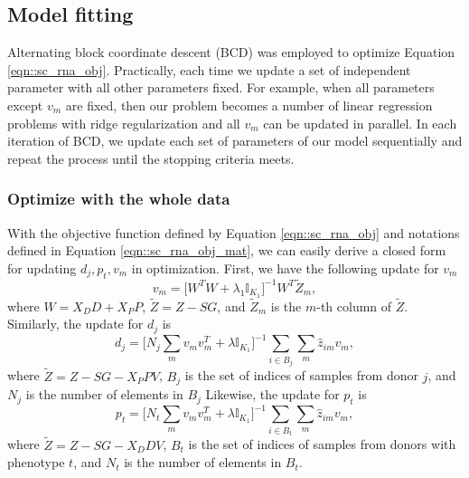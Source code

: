 \documentclass[12pt]{article}
\begin{document}
\subsection{Model fitting}
  Alternating block coordinate descent (BCD) was employed to optimize Equation \ref{eqn::sc_rna_obj}. Practically, each time we update a set of independent parameter with all other parameters fixed. For example, when all parameters except $v_m$ are fixed, then our problem becomes a number of linear regression problems with ridge regularization and all $v_m$ can be updated in parallel. In each iteration of BCD, we update each set of parameters of our model sequentially and repeat the process until the stopping criteria meets.

  \subsubsection*{Optimize with the whole data}
    With the objective function defined by Equation \ref{eqn::sc_rna_obj} and notations defined in Equation \ref{eqn::sc_rna_obj_mat}, we can easily derive a closed form for updating $d_j, p_t, v_m$ in optimization. First, we have the following update for $v_m$
    \begin{equation}
      \label{eqn::updating_vm}
      v_m = \big[ W^T W + \lambda_1 \mathbb{I}_{K_1} \big]^{-1} W^T \tilde{Z}_m,
    \end{equation}
    where $W = X_D D + X_P P$, $\tilde{Z} = Z - S G$, and $\tilde{Z}_m$ is the $m$-th column of $\tilde{Z}$. Similarly, the update for $d_j$ is 
    \begin{equation}
      \label{eqn::updating_dj}
      d_j = \big[ N_j \sum_m v_m v_m^T + \lambda \mathbb{I}_{K_1} \big]^{-1} \sum_{i \in B_j} \sum_m \hat{z}_{im} v_m,
    \end{equation}
    where $\tilde{Z} = Z - S G - X_P P V$, $B_j$ is the set of indices of samples from donor $j$, and $N_j$ is the number of elements in $B_j$ Likewise, the update for $p_t$ is 
    \begin{equation}
      \label{eqn::updating_pt}
      p_t = \big[ N_t \sum_m v_m v_m^T + \lambda \mathbb{I}_{K_1} \big]^{-1} \sum_{i \in B_t} \sum_m \hat{z}_{im} v_m,
    \end{equation}
    where $\tilde{Z} = Z - S G - X_D D V$, $B_t$ is the set of indices of samples from donors with phenotype $t$, and $N_t$ is the number of elements in $B_t$.
    
\end{document}
